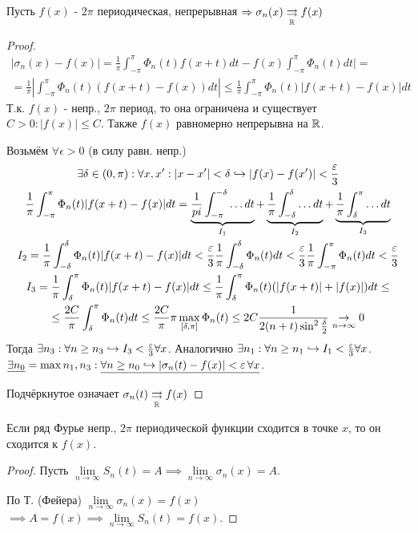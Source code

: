 \documentclass{article}
\begin{document}
\begin{theorem}[Фейера]
  Пусть $f(x)$ - $2\pi$ периодическая, непрерывная
  $\Rightarrow \sigma_n(x) \underset{\mathbb{R}}{\rightrightarrows} f(x)$
\end{theorem}
\begin{proof}
  \begin{gather*}
    |\sigma_n(x)-f(x)|=\frac{1}{\pi}\int_{-\pi}^{\pi}\Phi_n(t)f(x+t)dt-f(x)\int_{-\pi}^{\pi}\Phi_n(t)dt| = \\ 
  = \frac{1}{\pi}|\int_{-\pi}^{\pi}\Phi_n(t)(f(x+t)-f(x))dt|
  \le \frac{1}{\pi}\int_{-\pi}^{\pi}\Phi_n(t)|f(x+t)-f(x)|dt
  \end{gather*}
  Т.к. $f(x)$ - непр., $2\pi$ период, то она ограничена и существует $C>0:|f(x)|\le C$.
  Также $f(x)$ равномерно непрерывна на $\mathbb{R}$.
  
  Возьмём $\forall \epsilon>0$ (в силу равн. непр.) 
  \begin{gather*}
    \exists \delta \in (0,\pi): \forall x, x':|x-x'|<\delta \hookrightarrow |f(x)-f(x')|<\frac{\varepsilon}{3} \\ 
    \frac{1}{\pi}\int_{-\pi}^{\pi}\Phi_n(t)|f(x+t)-f(x)|dt=\underbrace{\frac{1}{pi}\int_{-\pi}^{-\delta}\dots dt}_{I_1} + \underbrace{\frac{1}{\pi}\int_{-\delta}^{\delta}\dots dt}_{I_2} + \underbrace{\frac{1}{\pi}\int_{\delta}^{\pi}\dots dt}_{I_3} \\ 
    I_2= \frac{1}{\pi}\int_{-\delta}^{\delta}\Phi_n(t)|f(x+t)-f(x)|dt < \frac{\varepsilon}{3}\frac{1}{\pi}\int_{-\delta}^{\delta}\Phi_n(t)dt 
    < \frac{\varepsilon}{3}\frac{1}{\pi}\int_{-\pi}^{\pi}\Phi_n(t)dt < \frac{\varepsilon}{3} \\ 
    I_3=\frac{1}{\pi}\int_{\delta}^{\pi}\Phi_n(t)|f(x+t)-f(x)|dt \le 
    \frac{1}{\pi}\int_{\delta}^{\pi}\Phi_n(t)(|f(x+t)|+|f(x)|)dt \le  \\
    \le \frac{2C}{\pi}\int_{\delta}^{\pi}\Phi_n(t)dt \le
    \frac{2C}{\pi}\pi \max \limits_{[\delta,\pi]} \Phi_n(t) \le 
    2C\frac{1}{2(n+t)\sin^{2}\frac{\delta}{2}} \underset{n\to\infty}{\to}0
  \end{gather*}
  Тогда $\exists n_3: \forall n \ge n_3 \hookrightarrow I_3<\frac{\varepsilon}{3} \forall x$.
  Аналогично $\exists n_1: \forall n \ge n_1 \hookrightarrow I_1<\frac{\varepsilon}{3} \forall x$.
  $\underline{\exists n_0}=\max{n_1,n_3}: \underline{\forall n \ge n_0 \hookrightarrow |\sigma_n(t)-f(x)|<\varepsilon \, \forall x}$.

  Подчёркнутое означает $\sigma_n(t)\underset{\mathbb{R}}{\rightrightarrows}f(x)$
\end{proof}
\begin{corollary}
  Если ряд Фурье непр., $2\pi$ периодической функции сходится в точке $x$,
  то он сходится к $f(x)$.
\end{corollary}
\begin{proof}
  Пусть $\lim \limits_{n\to\infty} S_n(t)=A \implies \lim \limits_{n\to\infty}\sigma_n(x)=A$.

  По Т. (Фейера) $\lim\limits_{n\to\infty}\sigma_n(x)=f(x)$
  $\implies A=f(x) \implies \lim\limits_{n\to\infty}S_n(t)=f(x)$.
\end{proof}
\end{document}
